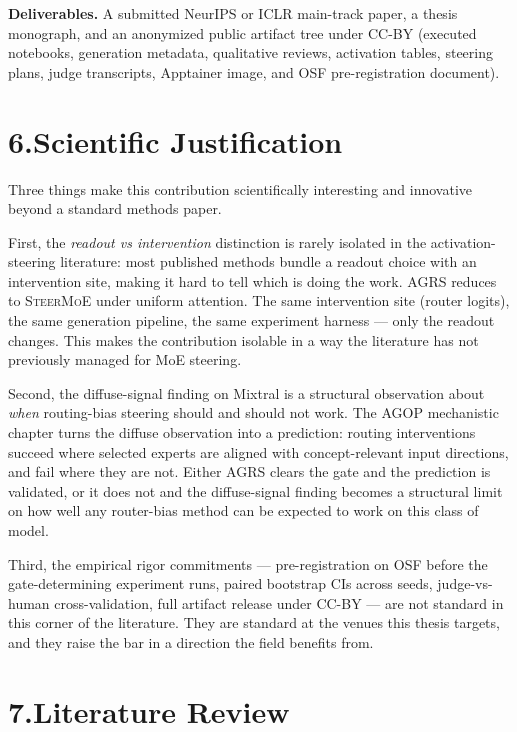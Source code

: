 \documentclass[11pt]{article}
\begin{document}
\noindent
\textbf{Deliverables.} A submitted NeurIPS or ICLR main-track paper,
a thesis monograph, and an anonymized public artifact tree under
CC-BY (executed notebooks, generation metadata, qualitative reviews,
activation tables, steering plans, judge transcripts, Apptainer
image, and OSF pre-registration document).

\section*{6.\quad Scientific Justification}

Three things make this contribution scientifically interesting and
innovative beyond a standard methods paper.

First, the \emph{readout vs intervention} distinction is rarely
isolated in the activation-steering literature: most published
methods bundle a readout choice with an intervention site, making
it hard to tell which is doing the work. AGRS reduces to
\textsc{SteerMoE} under uniform attention. The same intervention
site (router logits), the same generation pipeline, the same
experiment harness --- only the readout changes. This makes the
contribution isolable in a way the literature has not previously
managed for MoE steering.

Second, the diffuse-signal finding on Mixtral is a structural
observation about \emph{when} routing-bias steering should and
should not work. The AGOP mechanistic chapter turns the diffuse
observation into a prediction: routing interventions succeed where
selected experts are aligned with concept-relevant input
directions, and fail where they are not. Either AGRS clears the
gate and the prediction is validated, or it does not and the
diffuse-signal finding becomes a structural limit on how well any
router-bias method can be expected to work on this class of model.

Third, the empirical rigor commitments --- pre-registration on OSF
before the gate-determining experiment runs, paired bootstrap CIs
across seeds, judge-vs-human cross-validation, full artifact
release under CC-BY --- are not standard in this corner of the
literature. They are standard at the venues this thesis targets,
and they raise the bar in a direction the field benefits from.

\section*{7.\quad Literature Review}
\end{document}
